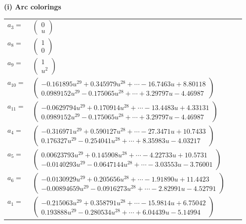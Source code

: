 \documentclass[1p]{elsarticle_modified}
\theoremstyle{definition}
\begin{document}
\flushleft \textbf{(i) Arc colorings}\\
\begin{tabular}{m{7pt} m{180pt} m{7pt} m{180pt} }
\flushright $a_{3}=$&$\begin{pmatrix}0\\u\end{pmatrix}$ \\
\flushright $a_{8}=$&$\begin{pmatrix}1\\0\end{pmatrix}$ \\
\flushright $a_{9}=$&$\begin{pmatrix}1\\u^2\end{pmatrix}$ \\
\flushright $a_{10}=$&$\begin{pmatrix}-0.161895 u^{29}+0.345979 u^{28}+\cdots-16.7463 u+8.80118\\0.0989152 u^{29}-0.175065 u^{28}+\cdots+3.29797 u-4.46987\end{pmatrix}$ \\
\flushright $a_{11}=$&$\begin{pmatrix}-0.0629794 u^{29}+0.170914 u^{28}+\cdots-13.4483 u+4.33131\\0.0989152 u^{29}-0.175065 u^{28}+\cdots+3.29797 u-4.46987\end{pmatrix}$ \\
\flushright $a_{4}=$&$\begin{pmatrix}-0.316971 u^{29}+0.590127 u^{28}+\cdots-27.3471 u+10.7433\\0.176327 u^{29}-0.254041 u^{28}+\cdots+8.35983 u-4.03217\end{pmatrix}$ \\
\flushright $a_{5}=$&$\begin{pmatrix}0.00623793 u^{29}+0.145908 u^{28}+\cdots-4.22733 u+10.5731\\-0.0140293 u^{29}-0.0647144 u^{28}+\cdots-3.03553 u-3.76001\end{pmatrix}$ \\
\flushright $a_{6}=$&$\begin{pmatrix}-0.0130929 u^{29}+0.205656 u^{28}+\cdots-1.91890 u+11.4423\\-0.00894659 u^{29}-0.0916273 u^{28}+\cdots-2.82991 u-4.52791\end{pmatrix}$ \\
\flushright $a_{1}=$&$\begin{pmatrix}-0.215063 u^{29}+0.358791 u^{28}+\cdots-15.9814 u+6.75042\\0.193888 u^{29}-0.280534 u^{28}+\cdots+6.04439 u-5.14994\end{pmatrix}$ \\

\end{tabular}
\end{document}
